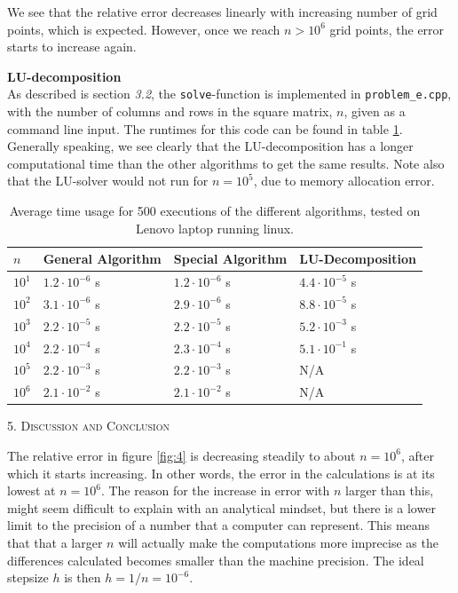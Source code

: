 \documentclass[a4paper,10pt]{article}
\begin{document}
We see that the relative error decreases linearly with increasing number of grid points, which is expected. However, once we reach $n > 10^6$ grid points, the error starts to increase again. 

\bigskip
{} \textbf{LU-decomposition} \\
As described is section \textit{3.2}, the \texttt{solve}-function is implemented in \texttt{problem\_e.cpp}, with the number of columns and rows in the square matrix, $n$, given as a command line input. The runtimes for this code can be found in table \ref{tab:LUres}. Generally speaking, we see clearly that the LU-decomposition has a longer computational time than the other algorithms to get the same results. Note also that the LU-solver would not run for $n = 10^5$, due to memory allocation error.


\begin{table}[]
\begin{tabular}{llll}
\hline
\hline
$n$ &General Algorithm  & Special Algorithm & LU-Decomposition \\
\hline
$10^1$ & $1.2\cdot 10^{-6}$ s & $1.2\cdot 10^{-6}$ s & $4.4\cdot 10^{-5}$ s\\
$10^2$ & $3.1\cdot 10^{-6}$ s & $2.9\cdot 10^{-6}$ s & $8.8\cdot 10^{-5}$ s\\
$10^3$ & $2.2\cdot 10^{-5}$ s & $2.2\cdot 10^{-5}$ s & $5.2\cdot 10^{-3}$ s\\
$10^4$ & $2.2\cdot 10^{-4}$ s & $2.3\cdot 10^{-4}$ s & $5.1\cdot 10^{-1}$ s\\
$10^5$ & $2.2\cdot 10^{-3}$ s & $2.2\cdot 10^{-3}$ s & N/A               \\
$10^6$ & $2.1\cdot 10^{-2}$ s & $2.1\cdot 10^{-2}$ s & N/A
\end{tabular}
\caption{Average time usage for 500 executions of the different algorithms, tested on Lenovo laptop running linux.}
\label{tab:LUres}
\end{table}




\begin{center}
\textsc{5. Discussion and Conclusion}
\end{center}


The relative error in figure \ref{fig:4} is decreasing steadily to about $n = 10^6$, after which it starts increasing. In other words, the error in the calculations is at its lowest at $n=10^6$. The reason for the increase in error with $n$ larger than this, might seem difficult to explain with an analytical mindset, but there is a lower limit to the precision of a number that a computer can represent. This means that that a larger $n$ will actually make the computations more imprecise as the differences calculated becomes smaller than the machine precision. The ideal stepsize $h$ is then $h = 1/n = 10^{-6}$. \\
\end{document}
